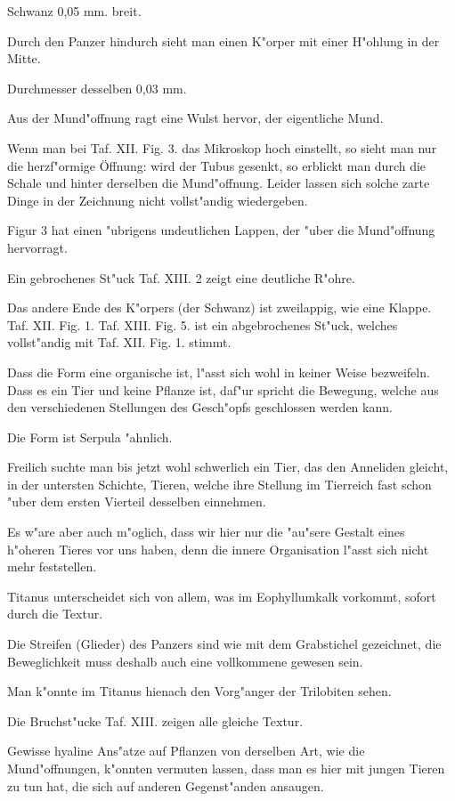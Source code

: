 \documentclass[a4paper, 11pt, oneside, german]{article}
\begin{document}
Schwanz 0,05 mm. breit.

Durch den Panzer hindurch sieht man einen K"orper mit einer H"ohlung in der Mitte.

Durchmesser desselben 0,03 mm.

Aus der Mund"offnung ragt eine Wulst hervor, der eigentliche Mund.

Wenn man bei Taf. XII. Fig. 3. das Mikroskop hoch einstellt, so sieht man nur die herzf"ormige Öffnung: wird der Tubus gesenkt, so erblickt man durch die Schale und hinter derselben die Mund"offnung. Leider lassen sich solche zarte Dinge in der Zeichnung nicht vollst"andig wiedergeben.

Figur 3 hat einen "ubrigens undeutlichen Lappen, der "uber die Mund"offnung hervorragt.

Ein gebrochenes St"uck Taf. XIII. 2 zeigt eine deutliche R"ohre.

Das andere Ende des K"orpers (der Schwanz) ist zweilappig, wie eine Klappe. Taf. XII. Fig. 1. Taf. XIII. Fig. 5. ist ein abgebrochenes St"uck, welches vollst"andig mit Taf. XII. Fig. 1. stimmt.

Dass die Form eine organische ist, l"asst sich wohl in keiner Weise bezweifeln. Dass es ein Tier und keine Pflanze ist, daf"ur spricht die Bewegung, welche aus den verschiedenen Stellungen des Gesch"opfs geschlossen werden kann.

Die Form ist Serpula "ahnlich.

Freilich suchte man bis jetzt wohl schwerlich ein Tier, das den Anneliden gleicht, in der untersten Schichte, Tieren, welche ihre Stellung im Tierreich fast schon "uber dem ersten Vierteil desselben einnehmen.

Es w"are aber auch m"oglich, dass wir hier nur die "au"sere Gestalt eines h"oheren Tieres vor uns haben, denn die innere Organisation l"asst sich nicht mehr feststellen.

Titanus unterscheidet sich von allem, was im Eophyllumkalk vorkommt, sofort durch die Textur.

Die Streifen (Glieder) des Panzers sind wie mit dem Grabstichel gezeichnet, die Beweglichkeit muss deshalb auch eine vollkommene gewesen sein.

Man k"onnte im Titanus hienach den Vorg"anger der Trilobiten sehen.

Die Bruchst"ucke Taf. XIII. zeigen alle gleiche Textur.

Gewisse hyaline Ans"atze auf Pflanzen von derselben Art, wie die Mund"offnungen, k"onnten vermuten lassen, dass man es hier mit jungen Tieren zu tun hat, die sich auf anderen Gegenst"anden ansaugen.
\end{document}
